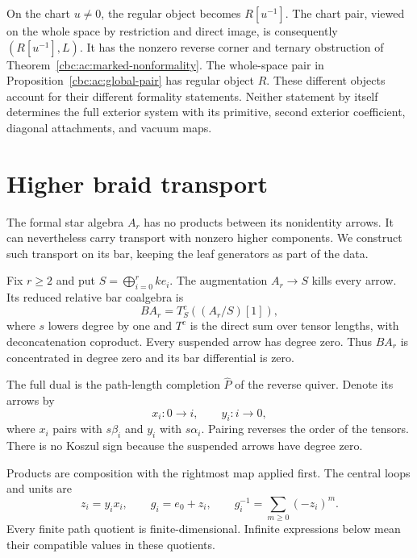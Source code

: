 On the chart $u\ne0$, the regular object becomes
$R[u^{-1}]$. The chart pair, viewed on the
whole space by restriction and direct image,
is consequently $(R[u^{-1}],L)$.
It has the nonzero reverse corner and ternary
obstruction of Theorem~\ref{cbc:ac:marked-nonformality}.
The whole-space pair in
Proposition~\ref{cbc:ac:global-pair} has regular
object $R$. These different objects account
for their different formality statements.
Neither statement by itself determines the
full exterior system with its primitive,
second exterior coefficient, diagonal
attachments, and vacuum maps.

\section{Higher braid transport}
\label{cbc:ac:braids}

The formal star algebra $A_r$ has no products between
its nonidentity arrows. It can nevertheless carry
transport with nonzero higher components. We construct
such transport on its bar, keeping the leaf generators
as part of the data.

Fix $r\geq2$ and put $S=\bigoplus_{i=0}^rke_i$.
The augmentation $A_r\to S$ kills every arrow.
Its reduced relative bar coalgebra is
\[
 BA_r=T_S^c((A_r/S)[1]),
\]
where $s$ lowers degree by one and $T^c$ is the
direct sum over tensor lengths, with deconcatenation
coproduct. Every suspended arrow has degree zero.
Thus $BA_r$ is concentrated in degree zero and
its bar differential is zero.

The full dual is the path-length completion
$\widehat P$ of the reverse quiver. Denote its
arrows by
\[
 x_i:0\longrightarrow i,\qquad
 y_i:i\longrightarrow0,
\]
where $x_i$ pairs with $s\beta_i$ and $y_i$
with $s\alpha_i$. Pairing reverses the order
of the tensors. There is no Koszul sign because
the suspended arrows have degree zero.

Products are composition with the rightmost map
applied first. The central loops and units are
\[
 z_i=y_ix_i,\qquad g_i=e_0+z_i,\qquad
 g_i^{-1}=\sum_{m\geq0}(-z_i)^m.
\]
Every finite path quotient is finite-dimensional.
Infinite expressions below mean their compatible
values in these quotients.

